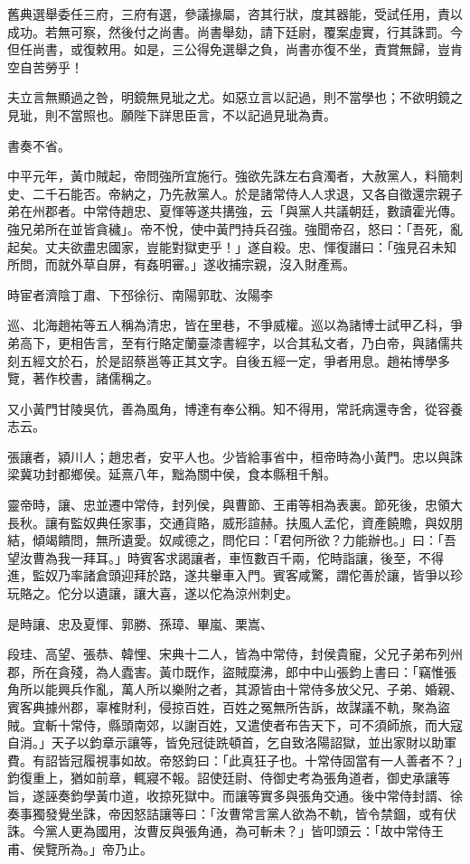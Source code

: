 \begin{pinyinscope}
舊典選舉委任三府，三府有選，參議掾屬，咨其行狀，度其器能，受試任用，責以成功。若無可察，然後付之尚書。尚書舉劾，請下廷尉，覆案虛實，行其誅罰。今但任尚書，或復敕用。如是，三公得免選舉之負，尚書亦復不坐，責賞無歸，豈肯空自苦勞乎！

夫立言無顯過之咎，明鏡無見玼之尤。如惡立言以記過，則不當學也；不欲明鏡之見玼，則不當照也。願陛下詳思臣言，不以記過見玼為責。

書奏不省。

中平元年，黃巾賊起，帝問強所宜施行。強欲先誅左右貪濁者，大赦黨人，料簡刺史、二千石能否。帝納之，乃先赦黨人。於是諸常侍人人求退，又各自徵還宗親子弟在州郡者。中常侍趙忠、夏惲等遂共搆強，云「與黨人共議朝廷，數讀霍光傳。強兄弟所在並皆貪穢」。帝不悅，使中黃門持兵召強。強聞帝召，怒曰：「吾死，亂起矣。丈夫欲盡忠國家，豈能對獄吏乎！」遂自殺。忠、惲復譖曰：「強見召未知所問，而就外草自屏，有姦明審。」遂收捕宗親，沒入財產焉。

時宦者濟陰丁肅、下邳徐衍、南陽郭耽、汝陽李

巡、北海趙祐等五人稱為清忠，皆在里巷，不爭威權。巡以為諸博士試甲乙科，爭弟高下，更相告言，至有行賂定蘭臺漆書經字，以合其私文者，乃白帝，與諸儒共刻五經文於石，於是詔蔡邕等正其文字。自後五經一定，爭者用息。趙祐博學多覽，著作校書，諸儒稱之。

又小黃門甘陵吳伉，善為風角，博達有奉公稱。知不得用，常託病還寺舍，從容養志云。

張讓者，潁川人；趙忠者，安平人也。少皆給事省中，桓帝時為小黃門。忠以與誅梁冀功封都鄉侯。延熹八年，黜為關中侯，食本縣租千斛。

靈帝時，讓、忠並遷中常侍，封列侯，與曹節、王甫等相為表裏。節死後，忠領大長秋。讓有監奴典任家事，交通貨賂，威形諠赫。扶風人孟佗，資產饒贍，與奴朋結，傾竭饋問，無所遺愛。奴咸德之，問佗曰：「君何所欲？力能辦也。」曰：「吾望汝曹為我一拜耳。」時賓客求謁讓者，車恆數百千兩，佗時詣讓，後至，不得進，監奴乃率諸倉頭迎拜於路，遂共轝車入門。賓客咸驚，謂佗善於讓，皆爭以珍玩賂之。佗分以遺讓，讓大喜，遂以佗為涼州刺史。

是時讓、忠及夏惲、郭勝、孫璋、畢嵐、栗嵩、

段珪、高望、張恭、韓悝、宋典十二人，皆為中常侍，封侯貴寵，父兄子弟布列州郡，所在貪殘，為人蠹害。黃巾既作，盜賊糜沸，郎中中山張鈞上書曰：「竊惟張角所以能興兵作亂，萬人所以樂附之者，其源皆由十常侍多放父兄、子弟、婚親、賓客典據州郡，辜榷財利，侵掠百姓，百姓之冤無所告訴，故謀議不軌，聚為盜賊。宜斬十常侍，縣頭南郊，以謝百姓，又遣使者布告天下，可不須師旅，而大寇自消。」天子以鈞章示讓等，皆免冠徒跣頓首，乞自致洛陽詔獄，並出家財以助軍費。有詔皆冠履視事如故。帝怒鈞曰：「此真狂子也。十常侍固當有一人善者不？」鈞復重上，猶如前章，輒寢不報。詔使廷尉、侍御史考為張角道者，御史承讓等旨，遂誣奏鈞學黃巾道，收掠死獄中。而讓等實多與張角交通。後中常侍封諝、徐奏事獨發覺坐誅，帝因怒詰讓等曰：「汝曹常言黨人欲為不軌，皆令禁錮，或有伏誅。今黨人更為國用，汝曹反與張角通，為可斬未？」皆叩頭云：「故中常侍王甫、侯覽所為。」帝乃止。


\end{pinyinscope}
